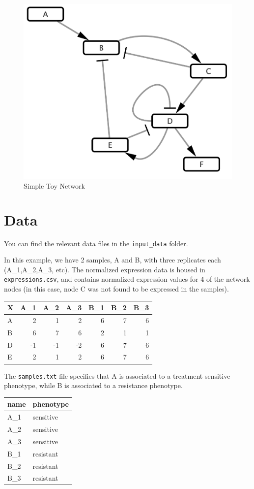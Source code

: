\documentclass[
]{book}
\begin{document}
\begin{figure}

{\centering \includegraphics[width=0.5\linewidth]{images/toy_network} 

}

\caption{Simple Toy Network}\label{fig:unnamed-chunk-3}
\end{figure}

\hypertarget{data}{%
\section{Data}\label{data}}

You can find the relevant data files in the \texttt{input\_data} folder.

In this example, we have 2 samples, A and B, with three replicates each (A\_1,A\_2,A\_3, etc).
The normalized expression data is housed in \texttt{expressions.csv}, and contains normalized expression values for 4 of the network nodes (in this case, node C was not found to be expressed in the samples).

\begin{tabular}{l|r|r|r|r|r|r}
\hline
X & A\_1 & A\_2 & A\_3 & B\_1 & B\_2 & B\_3\\
\hline
A & 2 & 1 & 2 & 6 & 7 & 6\\
\hline
B & 6 & 7 & 6 & 2 & 1 & 1\\
\hline
D & -1 & -1 & -2 & 6 & 7 & 6\\
\hline
E & 2 & 1 & 2 & 6 & 7 & 6\\
\hline
\end{tabular}

The \texttt{samples.txt} file specifies that A is associated to a treatment sensitive phenotype, while B is associated to a resistance phenotype.

\begin{tabular}{l|l}
\hline
name & phenotype\\
\hline
A\_1 & sensitive\\
\hline
A\_2 & sensitive\\
\hline
A\_3 & sensitive\\
\hline
B\_1 & resistant\\
\hline
B\_2 & resistant\\
\hline
B\_3 & resistant\\
\hline
\end{tabular}
\end{document}
